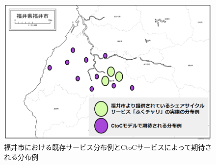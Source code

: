       \begin{figure}[b]
        \centering
        \includegraphics[scale=0.35]
        {figures/mappingExplain.png}
        \caption{福井市における既存サービス分布例とCtoCサービスによって期待される分布例}
        \label{fig:福井市における既存サービス分布例とCtoCサービスによって期待される分布例}
      \end{figure}


